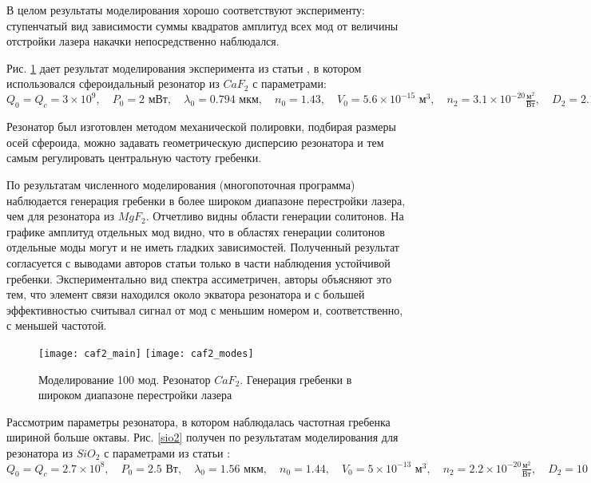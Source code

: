 В целом результаты моделирования хорошо соответствуют эксперименту: ступенчатый вид зависимости суммы квадратов амплитуд всех мод от величины отстройки лазера накачки непосредственно наблюдался.

Рис. \ref{caf2} дает результат моделирования эксперимента из статьи \cite{Savchenkov2011}, в котором использовался сфероидальный резонатор из $CaF_2$ с параметрами:
$
Q_0=Q_c=3\times10^9,\quad
P_0=2\text{ мВт},\quad
\lambda_0=0.794\text{ мкм}, \quad
n_0=1.43,\quad
V_0=5.6\times10^{-15}\text{ м}^3,\quad
n_2=3.1\times10^{-20}\frac{\text{м}^2}{\text{Вт}},\quad
D_2=2.1\times10^4\text{ Гц},\quad
D_3=0\text{ Гц}.$

Резонатор был изготовлен методом механической полировки, подбирая размеры осей сфероида, можно задавать геометрическую дисперсию резонатора и тем самым регулировать центральную частоту гребенки.

По результатам численного моделирования (многопоточная программа) наблюдается генерация гребенки в более широком диапазоне перестройки лазера, чем для резонатора из $MgF_2$. Отчетливо видны области генерации солитонов. На графике амплитуд отдельных мод видно, что в областях генерации солитонов отдельные моды могут и не иметь гладких зависимостей. Полученный результат согласуется с выводами авторов статьи только в части наблюдения устойчивой гребенки. Экспериментально вид спектра ассиметричен, авторы объясняют это тем, что элемент связи находился около экватора резонатора и с большей эффективностью считывал сигнал от мод с меньшим номером и, соответственно, с меньшей частотой.

\begin{figure}
  \texttt{[image: caf2\_main]}
  \texttt{[image: caf2\_modes]}
  \caption{Моделирование 100 мод. Резонатор $CaF_2$. Генерация гребенки в широком диапазоне перестройки лазера} \label{caf2}
\end{figure}

Рассмотрим параметры резонатора, в котором наблюдалась частотная гребенка шириной больше октавы. Рис. \ref{sio2} получен по результатам моделирования для резонатора из $SiO_2$ с параметрами из статьи \cite{DelHaye2011} :
$
Q_0=Q_c=2.7\times10^8,\quad
P_0=2.5\text{ Вт},\quad
\lambda_0=1.56\text{ мкм}, \quad
n_0=1.44,\quad
V_0=5\times10^{-13}\text{ м}^3,\quad
n_2=2.2\times10^{-20}\frac{\text{м}^2}{\text{Вт}},\quad
D_2=10\times10^6\text{ Гц},\quad
D_3=0.$

